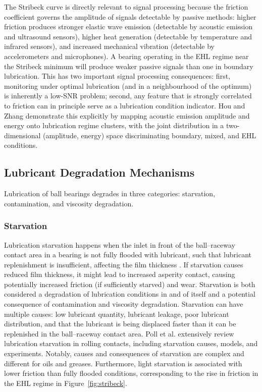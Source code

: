 The Stribeck curve is directly relevant to signal processing because the friction coefficient governs the amplitude of signals detectable by passive methods: higher friction produces stronger elastic wave emission (detectable by acoustic emission and ultrasound sensors), higher heat generation (detectable by temperature and infrared sensors), and increased mechanical vibration (detectable by accelerometers and microphones). A bearing operating in the EHL regime near the Stribeck minimum will produce weaker passive signals than one in boundary lubrication. This has two important signal processing consequences: first, monitoring under optimal lubrication (and in a neighbourhood of the optimum) is inherently a low-SNR problem; second, any feature that is strongly correlated to friction can in principle serve as a lubrication condition indicator. Hou and Zhang \cite{hou_-situ_2025} demonstrate this explicitly by mapping acoustic emission amplitude and energy onto lubrication regime clusters, with the joint distribution in a two-dimensional (amplitude, energy) space discriminating boundary, mixed, and EHL conditions.

\subsection{Lubricant Degradation Mechanisms}
\label{subsec:degradation}
Lubrication of ball bearings degrades in three categories: starvation, contamination, and viscosity degradation.
\subsubsection{Starvation}
Lubrication starvation happens when the inlet in front of the ball--raceway contact area in a bearing is not fully flooded with lubricant, such that lubricant replenishment is insufficient, affecting the film thickness \cite{chevalier_evolution_1998, poll_starved_2020}. If starvation causes reduced film thickness, it might lead to increased asperity contact, causing potentially increased friction (if sufficiently starved) and wear. Starvation is both considered a degradation of lubrication conditions in and of itself and a potential consequence of contamination and viscosity degradation. Starvation can have multiple causes: low lubricant quantity, lubricant leakage, poor lubricant distribution, and that the lubricant is being displaced faster than it can be replenished in the ball--raceway contact area. Poll et al. \cite{poll_starved_2020} extensively review lubrication starvation in rolling contacts, including starvation causes, models, and experiments. Notably, causes and consequences of starvation are complex and different for oils and greases. Furthermore, light starvation is associated with lower friction than fully flooded conditions, corresponding to the rise in friction in the EHL regime in Figure~\ref{fig:stribeck}.

